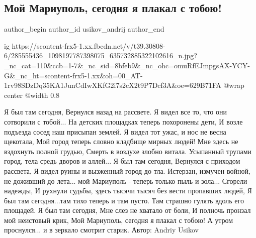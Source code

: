  
 
 
 
 
 
\subsection{Мой Мариуполь, сегодня я плакал с тобою!}
\label{sec:01_06_2022.fb.usikov_andrij.1.moj_mariupol_plakal_s_toboju}
 
\ifcmt
 author_begin
   author_id usikov_andrij
 author_end
\fi

\ifcmt
  ig https://scontent-frx5-1.xx.fbcdn.net/v/t39.30808-6/285555436_1098197787398075_635732885322102616_n.jpg?_nc_cat=110&ccb=1-7&_nc_sid=8bfeb9&_nc_ohc=omuRfEJmpgsAX-YCY-G&_nc_ht=scontent-frx5-1.xx&oh=00_AT-1rv98SDzDq35KA1JunCdIwXKfG2i7s2cX2t9P7Dcf3A&oe=629B71FA
  @wrap center
  @width 0.8
\fi

\begingroup
\Large
\obeycr
Я был там сегодня,
Вернулся назад на рассвете.
Я видел все то, что они сотворили с тобой...
На детских площадках теперь похоронены дети, 
И возле подъезда сосед наш присыпан землей.
\smallskip
Я видел тот ужас, и нос не весна щекотала, 
Мой город теперь словно кладбище мирных людей!
Мне здесь не вздохнуть полной грудью, 
Смерть в воздухе злобно витала.
\smallskip
Усыпанный трупами город, 
тела средь дворов и аллей...
Я был там сегодня,
Вернулся с приходом рассвета,
Я видел руины и вызженный город до тла. 
Истерзан, измучен войной, не доживший до лета...
мой Мариуполь - теперь только пыль и зола...
\smallskip
Сгорели надежды,
И рухнули судьбы, здесь тысячи тысяч без вести пропавших людей,
Я был там сегодня...там тихо теперь и там пусто. 
Там страшно гулять вдоль его площадей.
\smallskip
Я был там сегодня,
Мне слез не хватало от боли,
И полночь пронзал мой неистовый крик,
Мой Мариуполь, сегодня я плакал с тобою!
\smallskip
А утром проснулся... и в зеркало смотрит старик.
\smallskip
Автор: Andriy Usikov
\restorecr
\endgroup


